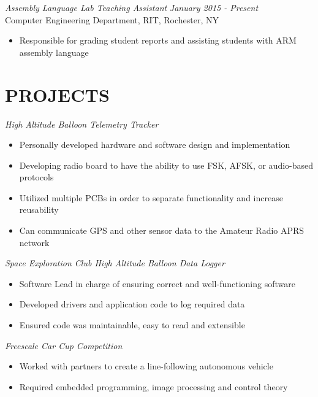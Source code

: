 \documentclass[line,margin]{res}
\begin{document}
\begin{resume}
	\vspace{-5pt}
		{\sl Assembly Language Lab Teaching Assistant } \hfill {\sl January 2015 - Present} \\
		Computer Engineering Department, RIT, Rochester, NY
		\begin{itemize}  \itemsep -2pt %
			\item Responsible for grading student reports and assisting students with ARM assembly language 
		\end{itemize} 
\section{PROJECTS}
	{\sl High Altitude Balloon Telemetry Tracker }
		\begin{itemize} \itemsep -2pt
			\item Personally developed hardware and software design and implementation
			\item Developing radio board to have the ability to use FSK, AFSK, or audio-based protocols
			\item Utilized multiple PCBs in order to separate functionality and increase reusability
			\item Can communicate GPS and other sensor data to the Amateur Radio APRS network
		\end{itemize}

	\vspace{-10pt}
	{\sl Space Exploration Club High Altitude Balloon Data Logger}
		\begin{itemize} \itemsep -2pt
			\item Software Lead in charge of ensuring correct and well-functioning software
			\item Developed drivers and application code to log required data
			\item Ensured code was maintainable, easy to read and extensible
			
		\end{itemize}
	\vspace{-10pt}
	{\sl Freescale Car Cup Competition}
		\begin{itemize} \itemsep -2pt
			\item Worked with partners to create a line-following autonomous vehicle
			\item Required embedded programming, image processing and control theory
		\end{itemize}


\end{resume}
\end{document}
